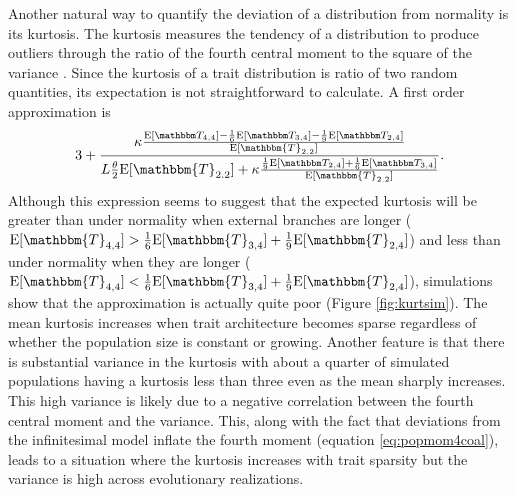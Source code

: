 Another natural way to quantify the deviation of a distribution from normality
is its kurtosis. The kurtosis measures the tendency of a distribution to produce
outliers through the ratio of the fourth central moment to the square of the
variance \citep{Westfall2014}. Since the kurtosis of a trait distribution is
ratio of two random quantities, its expectation is not straightforward to
calculate. A first order approximation is
\begin{equation}
3 + \frac{\kappa \frac{\CCC}{\E[\mathbbm{T}_{2.2}]}} {L \T \E[\mathbbm{T}_{2.2}]
    + \kappa \frac{\BBB}{\E[\mathbbm{T}_{2.2}]}}.
    \label{eq:firstord}
\end{equation}
Although this expression seems to suggest that the expected kurtosis will be
greater than under normality when external branches are longer ($\E[\mathbbm{T}_{4,4}] >
\frac{1}{6}\E[\mathbbm{T}_{3,4}] + \frac{1}{9}\E[\mathbbm{T}_{2,4}]$) and less than under normality
when they are longer ($\E[\mathbbm{T}_{4,4}] < \frac{1}{6}\E[\mathbbm{T}_{3,4}] +
\frac{1}{9}\E[\mathbbm{T}_{2,4}]$), simulations show that the approximation is actually
quite poor (Figure \ref{fig:kurtsim}). The mean kurtosis increases when trait
architecture becomes sparse regardless of whether the population size is
constant or growing. Another feature is that there is substantial variance in
the kurtosis with about a quarter of simulated populations having a kurtosis
less than three even as the mean sharply increases. This high variance is likely
due to a negative correlation between the fourth central moment and the
variance. This, along with the fact that deviations from the infinitesimal model
inflate the fourth moment (equation \eqref{eq:popmom4coal}), leads to a
situation where the kurtosis increases with trait sparsity but the variance is
high across evolutionary realizations.

